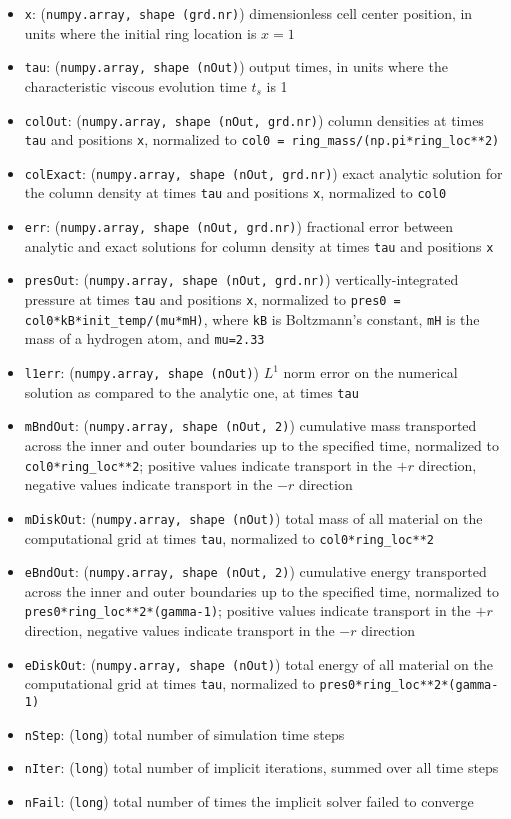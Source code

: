 \documentclass[12pt]{article}
\begin{document}
\begin{itemize}
\item \texttt{x}: (\texttt{numpy.array, shape (grd.nr)}) dimensionless cell center position, in units where the initial ring location is $x=1$
\item \texttt{tau}: (\texttt{numpy.array, shape (nOut)}) output times, in units where the characteristic viscous evolution time $t_s$ is 1
\item \texttt{colOut}: (\texttt{numpy.array, shape (nOut, grd.nr)}) column densities at times \verb=tau= and positions \verb=x=, normalized to \verb!col0 = ring_mass/(np.pi*ring_loc**2)!
\item \texttt{colExact}: (\texttt{numpy.array, shape (nOut, grd.nr)}) exact analytic solution for the column density at times \verb=tau= and positions \verb=x=, normalized to \verb=col0=
\item \texttt{err}: (\texttt{numpy.array, shape (nOut, grd.nr)}) fractional error between analytic and exact solutions for column density at times \verb=tau= and positions \verb=x=
\item \texttt{presOut}: (\texttt{numpy.array, shape (nOut, grd.nr)}) vertically-integrated pressure at times \verb=tau= and positions \verb=x=, normalized to \verb!pres0 = col0*kB*init_temp/(mu*mH)!, where \verb=kB= is Boltzmann's constant, \verb=mH= is the mass of a hydrogen atom, and \verb!mu=2.33!
\item \texttt{l1err}: (\texttt{numpy.array, shape (nOut)}) $L^1$ norm error on the numerical solution as compared to the analytic one, at times \verb=tau=
\item \texttt{mBndOut}: (\texttt{numpy.array, shape (nOut, 2)}) cumulative mass transported across the inner and outer boundaries up to the specified time, normalized to \verb=col0*ring_loc**2=; positive values indicate transport in the $+r$ direction, negative values indicate transport in the $-r$ direction
\item \texttt{mDiskOut}: (\texttt{numpy.array, shape (nOut)}) total mass of all material on the computational grid at times \verb=tau=, normalized to \verb=col0*ring_loc**2=
\item \texttt{eBndOut}: (\texttt{numpy.array, shape (nOut, 2)}) cumulative energy transported across the inner and outer boundaries up to the specified time, normalized to \\\verb=pres0*ring_loc**2*(gamma-1)=; positive values indicate transport in the $+r$ direction, negative values indicate transport in the $-r$ direction
\item \texttt{eDiskOut}: (\texttt{numpy.array, shape (nOut)}) total energy of all material on the computational grid at times \verb=tau=, normalized to \verb=pres0*ring_loc**2*(gamma-1)=
\item \texttt{nStep}: (\texttt{long}) total number of simulation time steps
\item \texttt{nIter}: (\texttt{long}) total number of implicit iterations, summed over all time steps
\item \texttt{nFail}: (\texttt{long}) total number of times the implicit solver failed to converge
\end{itemize}
\end{document}
